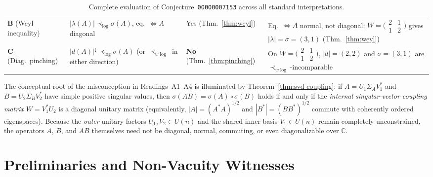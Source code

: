 \documentclass[11pt,a4paper]{article}
\theoremstyle{definition}
\newcommand{\C}{\mathbb{C}}
\begin{document}
\begin{table}[ht]
\begin{tabular}{@{}>{\raggedright\arraybackslash}p{2.6cm}>{\raggedright\arraybackslash}p{4.7cm}l>{\raggedright\arraybackslash}p{5.1cm}@{}}
\addlinespace[3pt]
\textbf{B} (Weyl inequality) & $|\lambda(A)| \prec_{\log} \sigma(A)$, eq.\ $\iff A$ diagonal & Yes (Thm.~\ref{thm:weyl}) & Eq.\ $\iff A$ normal, not diagonal; $W=\bigl(\begin{smallmatrix}2&1\\1&2\end{smallmatrix}\bigr)$ gives $|\lambda|=\sigma=(3,1)$ (Thm.~\ref{thm:weyl}) \\
\addlinespace[3pt]
\textbf{C} (Diag.\ pinching) & $|d(A)|^\downarrow \prec_{\log} \sigma(A)$ (or $\prec_{w\log}$ in either direction) & \textbf{No} (Thm.~\ref{thm:pinching}) & On $W=\bigl(\begin{smallmatrix}2&1\\1&2\end{smallmatrix}\bigr)$, $|d|=(2,2)$ and $\sigma=(3,1)$ are $\prec_{w\log}$-incomparable \\
\bottomrule
\end{tabular}
\caption{Complete evaluation of Conjecture~\texttt{00000007153} across all standard interpretations.}
\label{tab:interpretations}
\end{table}

The conceptual root of the misconception in Readings~A1--A4 is illuminated by Theorem~\ref{thm:svd-coupling}: if $A = U_1 \Sigma_A V_1^*$ and $B = U_2 \Sigma_B V_2^*$ have simple positive singular values, then $\sigma(AB) = \sigma(A)\circ\sigma(B)$ holds if and only if the \emph{internal singular-vector coupling matrix} $W = V_1^* U_2$ is a diagonal unitary matrix (equivalently, $|A| = (A^* A)^{1/2}$ and $|B^*| = (B B^*)^{1/2}$ commute with coherently ordered eigenspaces). Because the \emph{outer} unitary factors $U_1, V_2 \in U(n)$ and the shared inner basis $V_1 \in U(n)$ remain completely unconstrained, the operators $A$, $B$, and $AB$ themselves need not be diagonal, normal, commuting, or even diagonalizable over $\C$.

\section{Preliminaries and Non-Vacuity Witnesses}
\end{document}
